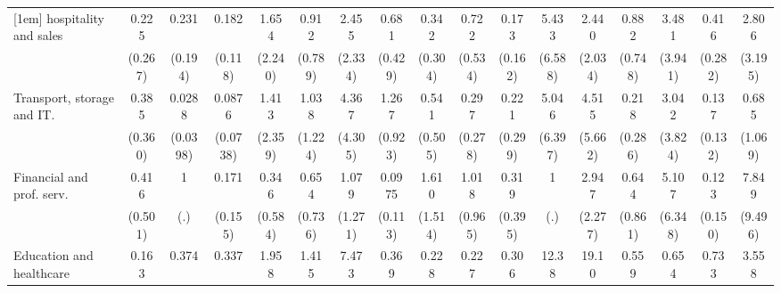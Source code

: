 {\begin{tabular}{l*{16}{c}}
[1em]
hospitality and sales&       0.225         &       0.231         &       0.182\sym{**} &       1.654         &       0.912         &       2.455         &       0.681         &       0.342         &       0.722         &       0.173         &       5.433         &       2.440         &       0.882         &       3.481         &       0.416         &       2.806         \\
                    &     (0.267)         &     (0.194)         &     (0.118)         &     (2.240)         &     (0.789)         &     (2.334)         &     (0.429)         &     (0.304)         &     (0.534)         &     (0.162)         &     (6.588)         &     (2.034)         &     (0.748)         &     (3.941)         &     (0.282)         &     (3.195)         \\
[1em]
Transport, storage and IT.&       0.385         &      0.0288\sym{*}  &      0.0876\sym{**} &       1.413         &       1.038         &       4.367         &       1.267         &       0.541         &       0.297         &       0.221         &       5.046         &       4.515         &       0.218         &       3.042         &       0.137\sym{*}  &       0.685         \\
                    &     (0.360)         &    (0.0398)         &    (0.0738)         &     (2.359)         &     (1.224)         &     (4.305)         &     (0.923)         &     (0.505)         &     (0.278)         &     (0.299)         &     (6.397)         &     (5.662)         &     (0.286)         &     (3.824)         &     (0.132)         &     (1.069)         \\
[1em]
Financial and prof. serv.&       0.416         &           1         &       0.171         &       0.346         &       0.654         &       1.079         &      0.0975\sym{*}  &       1.610         &       1.018         &       0.319         &           1         &       2.947         &       0.644         &       5.107         &       0.123         &       7.849         \\
                    &     (0.501)         &         (.)         &     (0.155)         &     (0.584)         &     (0.736)         &     (1.271)         &     (0.113)         &     (1.514)         &     (0.965)         &     (0.395)         &         (.)         &     (2.277)         &     (0.861)         &     (6.348)         &     (0.150)         &     (9.496)         \\
[1em]
Education and healthcare&       0.163         &       0.374         &       0.337         &       1.958         &       1.415         &       7.473\sym{*}  &       0.369         &       0.228         &       0.227         &       0.306         &       12.38\sym{*}  &       19.10\sym{**} &       0.559         &       0.654         &       0.733         &       3.558         \\

\end{tabular}}
